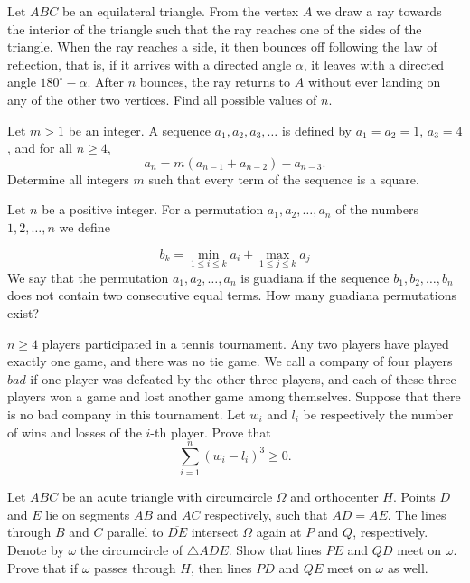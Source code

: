 \documentclass[11pt]{scrartcl}
\begin{document}
\begin{problem}[4364014706118582858]
Let $ABC$ be an equilateral triangle. From the vertex $A$ we draw a ray towards the interior of the triangle such that the ray reaches one of the sides of the triangle. When the ray reaches a side, it then bounces off following the law of reflection, that is, if it arrives with a directed angle $\alpha$, it leaves with a directed angle $180^{\circ}-\alpha$. After $n$ bounces, the ray returns to $A$ without ever landing on any of the other two vertices. Find all possible values of $n$.
\end{problem}
\begin{problem}[732021656607287]
Let $m > 1$ be an integer. A sequence $a_1, a_2, a_3, \ldots$ is defined by $a_1 = a_2 = 1$, $a_3 = 4$, and for all $n \ge 4$,$$a_n = m(a_{n - 1} + a_{n - 2}) - a_{n - 3}.$$
Determine all integers $m$ such that every term of the sequence is a square.
\end{problem}
\begin{problem}[351896324490208]
Let $n$ be a positive integer. For a permutation $a_1, a_2, \dots, a_n$ of the numbers $1, 2, \dots, n$ we define

$$b_k = \min_{1 \leq i \leq k} a_i + \max_{1 \leq j \leq k} a_j$$
We say that the permutation $a_1, a_2, \dots, a_n$ is guadiana if the sequence $b_1, b_2, \dots, b_n$ does not contain two consecutive equal terms. How many guadiana permutations exist?
\end{problem}
\begin{problem}[5886572081531632011]
	$n \geq 4$ players participated in a tennis tournament. Any two players have played exactly one game, and there was no tie game. We call a company of four players $bad$ if one player was defeated by the other three players, and each of these three players won a game and lost another game among themselves. Suppose that there is no bad company in this tournament. Let $w_i$ and $l_i$ be respectively the number of wins and losses of the $i$-th player. Prove that\[\sum^n_{i=1} \left(w_i - l_i\right)^3 \geq 0.\]
\end{problem}
\begin{problem}[63514716280156]
Let $ABC$ be an acute triangle with circumcircle $\Omega$ and orthocenter $H$. Points $D$ and $E$ lie on segments $AB$ and $AC$ respectively, such that $AD = AE$. The lines through $B$ and $C$ parallel to $\overline{DE}$ intersect $\Omega$ again at $P$ and $Q$, respectively. Denote by $\omega$ the circumcircle of $\triangle ADE$.
Show that lines $PE$ and $QD$ meet on $\omega$.
Prove that if $\omega$ passes through $H$, then lines $PD$ and $QE$ meet on $\omega$ as well.
\end{problem}
\end{document}
